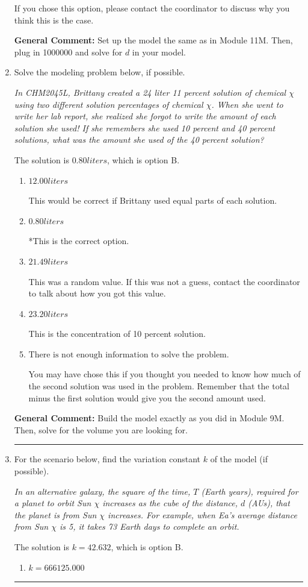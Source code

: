 \documentclass{extbook}[14pt]
\newcommand{\litem}[1]{\item #1

\rule{\textwidth}{0.4pt}}
\begin{document}
\begin{enumerate}
{\begin{enumerate}[label=\Alph*.]
If you chose this option, please contact the coordinator to discuss why you think this is the case.
\end{enumerate}

\textbf{General Comment:} Set up the model the same as in Module 11M. Then, plug in 1000000 and solve for $d$ in your model.
}
\litem{
Solve the modeling problem below, if possible.

\begin{center}
    \textit{ In CHM2045L, Brittany created a 24 liter 11 percent solution of chemical $\chi$ using two different solution percentages of chemical $\chi$. When she went to write her lab report, she realized she forgot to write the amount of each solution she used! If she remembers she used 10 percent and 40 percent solutions, what was the amount she used of the 40 percent solution? }
\end{center}
The solution is \( 0.80 liters \), which is option B.\begin{enumerate}[label=\Alph*.]
\item \( 12.00 liters \)

This would be correct if Brittany used equal parts of each solution.
\item \( 0.80 liters \)

*This is the correct option.
\item \( 21.49 liters \)

This was a random value. If this was not a guess, contact the coordinator to talk about how you got this value.
\item \( 23.20 liters \)

This is the concentration of 10 percent solution.
\item \( \text{There is not enough information to solve the problem.} \)

You may have chose this if you thought you needed to know how much of the second solution was used in the problem. Remember that the total minus the first solution would give you the second amount used.
\end{enumerate}

\textbf{General Comment:} Build the model exactly as you did in Module 9M. Then, solve for the volume you are looking for.
}
\litem{
For the scenario below, find the variation constant $k$ of the model (if possible).

\begin{center}
    \textit{ In an alternative galaxy, the square of the time, $T$ (Earth years), required for a planet to orbit Sun $\chi$ increases as the cube of the distance, $d$ (AUs), that the planet is from Sun $\chi$ increases. For example, when Ea's average distance from Sun $\chi$ is 5, it takes 73 Earth days to complete an orbit. }
\end{center}
The solution is \( k = 42.632 \), which is option B.\begin{enumerate}[label=\Alph*.]
\item \( k = 666125.000 \)


\end{enumerate}}
\end{enumerate}
\end{document}
